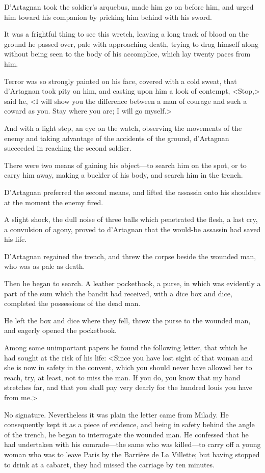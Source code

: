 D'Artagnan took the soldier's arquebus, made him go on before him, and urged him toward his companion by pricking him behind with his sword. 

It was a frightful thing to see this wretch, leaving a long track of blood on the ground he passed over, pale with approaching death, trying to drag himself along without being seen to the body of his accomplice, which lay twenty paces from him. 

Terror was so strongly painted on his face, covered with a cold sweat, that d'Artagnan took pity on him, and casting upon him a look of contempt, <Stop,> said he, <I will show you the difference between a man of courage and such a coward as you. Stay where you are; I will go myself.> 

And with a light step, an eye on the watch, observing the movements of the enemy and taking advantage of the accidents of the ground, d'Artagnan succeeded in reaching the second soldier. 

There were two means of gaining his object---to search him on the spot, or to carry him away, making a buckler of his body, and search him in the trench. 

D'Artagnan preferred the second means, and lifted the assassin onto his shoulders at the moment the enemy fired. 

A slight shock, the dull noise of three balls which penetrated the flesh, a last cry, a convulsion of agony, proved to d'Artagnan that the would-be assassin had saved his life. 

D'Artagnan regained the trench, and threw the corpse beside the wounded man, who was as pale as death. 

Then he began to search. A leather pocketbook, a purse, in which was evidently a part of the sum which the bandit had received, with a dice box and dice, completed the possessions of the dead man. 

He left the box and dice where they fell, threw the purse to the wounded man, and eagerly opened the pocketbook. 

Among some unimportant papers he found the following letter, that which he had sought at the risk of his life: <Since you have lost sight of that woman and she is now in safety in the convent, which you should never have allowed her to reach, try, at least, not to miss the man. If you do, you know that my hand stretches far, and that you shall pay very dearly for the hundred louis you have from me.> 

No signature. Nevertheless it was plain the letter came from Milady. He consequently kept it as a piece of evidence, and being in safety behind the angle of the trench, he began to interrogate the wounded man. He confessed that he had undertaken with his comrade---the same who was killed---to carry off a young woman who was to leave Paris by the Barrière de La Villette; but having stopped to drink at a cabaret, they had missed the carriage by ten minutes. 

